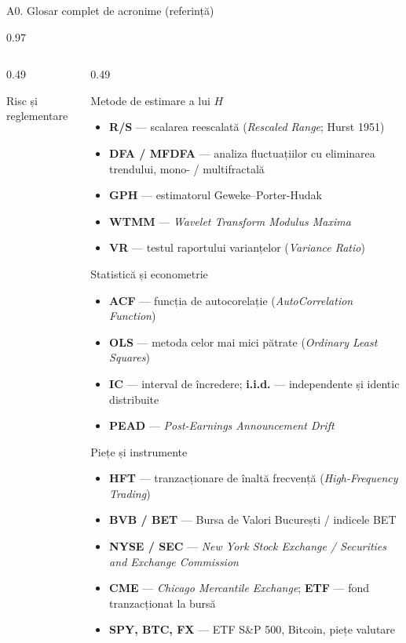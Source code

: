 \documentclass[9pt, aspectratio=169, t]{beamer}
\begin{document}
\begin{frame}[shrink=35]{A0. Glosar complet de acronime (referință)}
\begin{cminipage}{0.97\textwidth}
\begin{columns}[T]
\begin{column}{0.49\textwidth}
\begin{block}{Risc și reglementare}
\begin{itemize}
\end{itemize}
\end{block}
\end{column}
\begin{column}{0.49\textwidth}
\begin{block}{Metode de estimare a lui $H$}
\begin{itemize}\setlength{\itemsep}{0pt}
    \item \textbf{R/S} --- scalarea reescalată (\textit{Rescaled Range}; Hurst 1951)
    \item \textbf{DFA / MFDFA} --- analiza fluctuațiilor cu eliminarea trendului, mono- / multifractală
    \item \textbf{GPH} --- estimatorul Geweke--Porter-Hudak
    \item \textbf{WTMM} --- \textit{Wavelet Transform Modulus Maxima}
    \item \textbf{VR} --- testul raportului varianțelor (\textit{Variance Ratio})
\end{itemize}
\end{block}
\begin{block}{Statistică și econometrie}
\begin{itemize}\setlength{\itemsep}{0pt}
    \item \textbf{ACF} --- funcția de autocorelație (\textit{AutoCorrelation Function})
    \item \textbf{OLS} --- metoda celor mai mici pătrate (\textit{Ordinary Least Squares})
    \item \textbf{IC} --- interval de încredere; \textbf{i.i.d.} --- independente și identic distribuite
    \item \textbf{PEAD} --- \textit{Post-Earnings Announcement Drift}
\end{itemize}
\end{block}
\begin{block}{Piețe și instrumente}
\begin{itemize}\setlength{\itemsep}{0pt}
    \item \textbf{HFT} --- tranzacționare de înaltă frecvență (\textit{High-Frequency Trading})
    \item \textbf{BVB / BET} --- Bursa de Valori București / indicele BET
    \item \textbf{NYSE / SEC} --- \textit{New York Stock Exchange / Securities and Exchange Commission}
    \item \textbf{CME} --- \textit{Chicago Mercantile Exchange}; \textbf{ETF} --- fond tranzacționat la bursă
    \item \textbf{SPY, BTC, FX} --- ETF S\&P 500, Bitcoin, piețe valutare
\end{itemize}
\end{block}
\end{column}
\end{columns}
\end{cminipage}
\end{frame}
\end{document}
